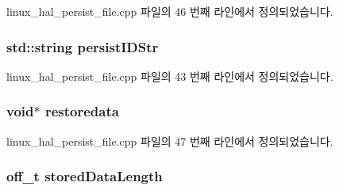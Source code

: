 linux\+\_\+hal\+\_\+persist\+\_\+file.\+cpp 파일의 46 번째 라인에서 정의되었습니다.

\subsubsection[{\texorpdfstring{persist\+I\+D\+Str}{persistIDStr}}]{\setlength{\rightskip}{0pt plus 5cm}std\+::string persist\+I\+D\+Str\hspace{0.3cm}{\ttfamily [private]}}\hypertarget{class_linux_g_p_t_p_persist_file_a2f6a119a0e628824cfab261ed6dbcbeb}{}\label{class_linux_g_p_t_p_persist_file_a2f6a119a0e628824cfab261ed6dbcbeb}


linux\+\_\+hal\+\_\+persist\+\_\+file.\+cpp 파일의 43 번째 라인에서 정의되었습니다.

\subsubsection[{\texorpdfstring{restoredata}{restoredata}}]{\setlength{\rightskip}{0pt plus 5cm}void$\ast$ restoredata\hspace{0.3cm}{\ttfamily [private]}}\hypertarget{class_linux_g_p_t_p_persist_file_a28b6f2edcdfd82ce519236fe075a678c}{}\label{class_linux_g_p_t_p_persist_file_a28b6f2edcdfd82ce519236fe075a678c}


linux\+\_\+hal\+\_\+persist\+\_\+file.\+cpp 파일의 47 번째 라인에서 정의되었습니다.

\subsubsection[{\texorpdfstring{stored\+Data\+Length}{storedDataLength}}]{\setlength{\rightskip}{0pt plus 5cm}off\+\_\+t stored\+Data\+Length\hspace{0.3cm}{\ttfamily [private]}}\hypertarget{class_linux_g_p_t_p_persist_file_a18b03182ab5a38eb86dc01dee48c13eb}{}\label{class_linux_g_p_t_p_persist_file_a18b03182ab5a38eb86dc01dee48c13eb}


